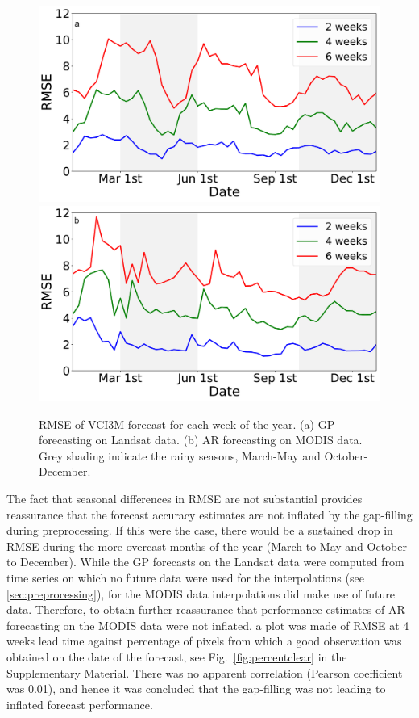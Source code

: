 \documentclass[review]{elsarticle}
\begin{document}
\begin{figure}
	\centering
	\includegraphics[trim = 30mm 15mm 0mm 10mm,width=5.4 cm]{figures/seasonal_LANDSAT_1Region.pdf} \qquad \includegraphics[trim = 30mm 15mm 0mm 10mm,width=5.4 cm]{figures/seasonal_MODIS_1Region.pdf}
	\vspace{0.5cm}
	\caption{RMSE of VCI3M forecast for each week of the year. (a) GP forecasting on Landsat data. (b) AR forecasting on MODIS data. Grey shading indicate the rainy seasons, March-May and October-December.} \label{fig:seasonal}
\end{figure}

The fact that seasonal differences in RMSE are not substantial provides reassurance that the forecast accuracy estimates are not inflated by the gap-filling during preprocessing. If this were the case, there would be a sustained drop in RMSE during the more overcast months of the year (March to May and October to December). While the GP forecasts on the Landsat data were computed from time series on which no future data were used for the interpolations (see \ref{sec:preprocessing}), for the MODIS data interpolations did make use of future data. Therefore, to obtain further reassurance that performance estimates of AR forecasting on the MODIS data were not inflated, a plot was made of RMSE at 4 weeks lead time against percentage of pixels from which a good observation was obtained on the date of the forecast, see Fig.~\ref{fig:percentclear} in the Supplementary Material. There was no apparent correlation (Pearson coefficient was 0.01), and hence it was concluded that the gap-filling was not leading to inflated forecast performance.
\end{document}
